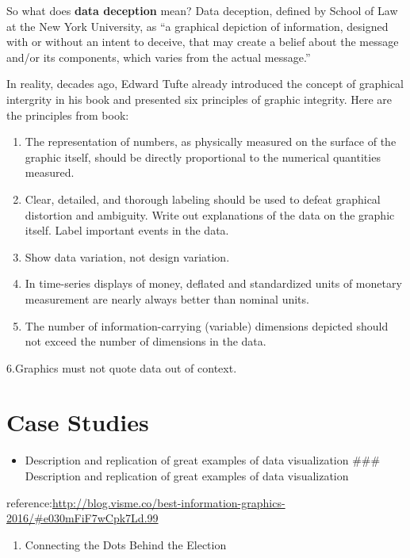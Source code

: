 \documentclass[]{book}
\providecommand{\tightlist}{%
  \setlength{\itemsep}{0pt}\setlength{\parskip}{0pt}}
\theoremstyle{definition}
\theoremstyle{definition}
\theoremstyle{definition}
\theoremstyle{remark}
\begin{document}
So what does \textbf{data deception} mean? Data deception, defined by
School of Law at the New York University, as ``a graphical depiction of
information, designed with or without an intent to deceive, that may
create a belief about the message and/or its components, which varies
from the actual message.''

In reality, decades ago, Edward Tufte already introduced the concept of
graphical intergrity in his book and presented six principles of graphic
integrity. Here are the principles from book:

\begin{enumerate}
\def\labelenumi{\arabic{enumi}.}
\item
  The representation of numbers, as physically measured on the surface
  of the graphic itself, should be directly proportional to the
  numerical quantities measured.
\item
  Clear, detailed, and thorough labeling should be used to defeat
  graphical distortion and ambiguity. Write out explanations of the data
  on the graphic itself. Label important events in the data.
\item
  Show data variation, not design variation.
\item
  In time-series displays of money, deﬂated and standardized units of
  monetary measurement are nearly always better than nominal units.
\item
  The number of information-carrying (variable) dimensions depicted
  should not exceed the number of dimensions in the data.
\end{enumerate}

6.Graphics must not quote data out of context.

\chapter{Case Studies}\label{case-studies}

\begin{itemize}
\tightlist
\item
  Description and replication of great examples of data visualization
  \#\#\# Description and replication of great examples of data
  visualization
\end{itemize}

reference:\url{http://blog.visme.co/best-information-graphics-2016/\#e030mFiF7wCpk7Ld.99}

\begin{enumerate}
\def\labelenumi{\arabic{enumi}.}
\tightlist
\item
  Connecting the Dots Behind the Election
\end{enumerate}
\end{document}
